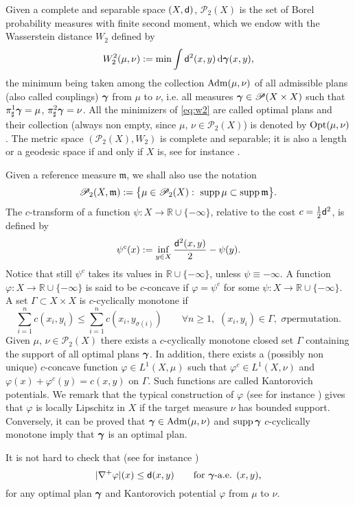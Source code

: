 \documentclass[reqno,11pt]{article}
\numberwithin{equation}{section}
\newcommand{\R}{\mathbb{R}}
\newcommand{\mm}{{\mbox{\boldmath$m$}}}
\newcommand{\ggamma}{{\mbox{\boldmath$\gamma$}}}
\newcommand{\sfd}{{\sf d}}
\newcommand{\supp}{\mathop{\rm supp}\nolimits}   %
\renewcommand{\d}{{\mathrm d}}
\newcommand{\Probabilities}[1]{\mathscr P(#1)}          %
\newcommand{\ProbabilitiesTwo}[1]{\mathscr P_2(#1)}     %
\newcommand{\prob}{\Probabilities}
\newcommand{\probt}{\ProbabilitiesTwo}
\newcommand{\opt}[2]{{\rm{Opt}}(#1,#2)}
\newcommand{\adm}[2]{{\rm{Adm}}(#1,#2)}
\renewcommand{\mm}{\mathfrak m}
\begin{document}
Given a complete and separable space
 $(X,\sfd)$, $\probt X$ is the set of Borel
probability measures with finite second moment,  which we endow with
the Wasserstein distance $W_2$ defined by
\begin{equation}
\label{eq:w2} W_2^2(\mu,\nu):=\min\int\sfd^2(x,y)\,\d\ggamma(x,y),
\end{equation}
the minimum being taken among the collection $\adm\mu\nu$ of all
admissible plans (also called couplings) $\ggamma$ from $\mu$ to
$\nu$, i.e. all measures $\ggamma\in\prob{X\times X}$ such that
$\pi^1_\sharp\ggamma=\mu$, $\pi^2_\sharp\ggamma=\nu$. All the
minimizers of \eqref{eq:w2} are called optimal plans and their
collection (always non empty, since $\mu,\,\nu\in \probt X$) is
denoted by $\opt\mu\nu$. The metric space $(\probt X,W_2)$ is
complete and separable; it is also a length or a geodesic space if
and only if $X$ is, see for instance \cite[Theorem~2.10,
Remark~2.14]{Ambrosio-Gigli11}.

Given a reference measure $\mm$, we shall also use the notation
$$
\probt{X,\mm}:=\big\{\mu\in\probt{X}:\
\supp\mu\subset\supp\mm\big\}.
$$
The $c$-transform of a function $\psi:X\to\R\cup\{-\infty\}$,
relative to the cost $c=\tfrac{1}{2}\sfd^2$, is defined by
\[
\psi^c(x):=\inf_{y\in X}\frac{\sfd^2(x,y)}{2}-\psi(y).
\]
Notice that still $\psi^c$ takes its values in $\R\cup\{-\infty\}$,
unless $\psi\equiv -\infty$. A function
$\varphi:X\to\R\cup\{-\infty\}$ is said to be $c$-concave if
$\varphi=\psi^c$ for some $\psi:X\to\R\cup\{-\infty\}$. A set
$\Gamma\subset X\times X$ is $c$-cyclically monotone if
\[
\sum_{i=1}^n c(x_i,y_i)\leq\sum_{i=1}^n c(x_i,y_{\sigma(i)})
\qquad\forall n\geq 1,\,\,(x_i,y_i)\in\Gamma,\,\,\text{$\sigma$
permutation.}
\]
Given $\mu,\,\nu\in\probt X$ there exists a $c$-cyclically monotone
closed set $\Gamma$ containing the support of all optimal plans
$\ggamma$. In addition, there exists a (possibly non unique)
$c$-concave function $\varphi\in L^1(X,\mu)$ such that $\varphi^c\in
L^1(X,\nu)$ and $\varphi(x)+\varphi^c(y)=c(x,y)$ on $\Gamma$. Such
functions are called Kantorovich potentials. We remark that the
typical construction of $\varphi$ (see for instance
\cite[Theorem~6.1.4]{Ambrosio-Gigli-Savare08}) gives that $\varphi$
is locally Lipschitz in $X$ if the target measure $\nu$ has bounded
support. Conversely, it can be proved that $\ggamma\in\adm\mu\nu$
and $\supp\ggamma$ $c$-cyclically monotone imply that $\ggamma$ is
an optimal plan.

It is not hard to check that (see for instance
\cite[Proposition~3.9]{Ambrosio-Gigli-Savare11})
\begin{equation}\label{eq:propkant}
|\nabla^+\varphi|(x)\leq \sfd(x,y)\qquad\text{for $\ggamma$-a.e.
$(x,y)$,}
\end{equation}
for any optimal plan $\ggamma$ and Kantorovich potential $\varphi$
from $\mu$ to $\nu$.
\end{document}
